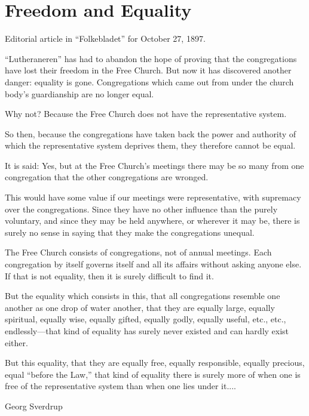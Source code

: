
\section{Freedom and Equality}

Editorial article in “Folkebladet” for October 27, 1897.

“Lutheraneren” has had to abandon the hope of proving that the congregations have lost their freedom in the Free Church. But now it has discovered another danger: equality is gone. Congregations which came out from under the church body’s guardianship are no longer equal.

Why not? Because the Free Church does not have the representative system.

So then, because the congregations have taken back the power and authority of which the representative system deprives them, they therefore cannot be equal.

It is said: Yes, but at the Free Church’s meetings there may be so many from one congregation that the other congregations are wronged.

This would have some value if our meetings were representative, with supremacy over the congregations. Since they have no other influence than the purely voluntary, and since they may be held anywhere, or wherever it may be, there is surely no sense in saying that they make the congregations unequal.

The Free Church consists of congregations, not of annual meetings. Each congregation by itself governs itself and all its affairs without asking anyone else. If that is not equality, then it is surely difficult to find it.

But the equality which consists in this, that all congregations resemble one another as one drop of water another, that they are equally large, equally spiritual, equally wise, equally gifted, equally godly, equally useful, etc., etc., endlessly—that kind of equality has surely never existed and can hardly exist either.

But this equality, that they are equally free, equally responsible, equally precious, equal “before the Law,” that kind of equality there is surely more of when one is free of the representative system than when one lies under it....

Georg Sverdrup
